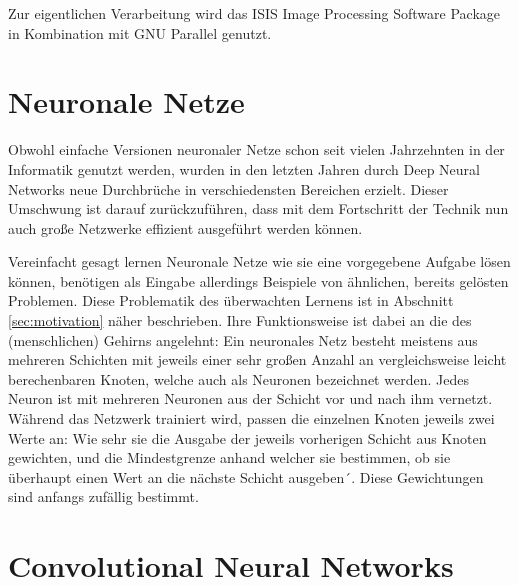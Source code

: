 Zur eigentlichen Verarbeitung wird das ISIS Image Processing Software Package\cite{isis} in Kombination mit GNU Parallel\cite{gnuparallel} genutzt.

\section{Neuronale Netze}
\label{sec:neuronalenetze}

Obwohl einfache Versionen neuronaler Netze schon seit vielen Jahrzehnten in der Informatik genutzt werden, wurden in den letzten Jahren durch Deep Neural Networks neue Durchbrüche in verschiedensten Bereichen erzielt. Dieser Umschwung ist darauf zurückzuführen, dass mit dem Fortschritt der Technik nun auch große Netzwerke effizient ausgeführt werden können.

Vereinfacht gesagt lernen Neuronale Netze wie sie eine vorgegebene Aufgabe lösen können\cite{mitnews_nn}, benötigen als Eingabe allerdings Beispiele von ähnlichen, bereits gelösten Problemen. Diese Problematik des überwachten Lernens ist in Abschnitt \ref{sec:motivation} näher beschrieben. Ihre Funktionsweise ist dabei an die des (menschlichen) Gehirns angelehnt: Ein neuronales Netz besteht meistens aus mehreren Schichten mit jeweils einer sehr großen Anzahl an vergleichsweise leicht berechenbaren Knoten, welche auch als Neuronen bezeichnet werden. Jedes Neuron ist mit mehreren Neuronen aus der Schicht vor und nach ihm vernetzt.\cite{schmidhuber2015deep} Während das Netzwerk trainiert wird, passen die einzelnen Knoten jeweils zwei Werte an: Wie sehr sie die Ausgabe der jeweils vorherigen Schicht aus Knoten gewichten, und die Mindestgrenze anhand welcher sie bestimmen, ob sie überhaupt einen Wert an die nächste Schicht ausgeben´. Diese Gewichtungen sind anfangs zufällig bestimmt.\cite{mitnews_nn, schmidhuber2015deep}

\section{Convolutional Neural Networks}
\label{sec:cnn}
